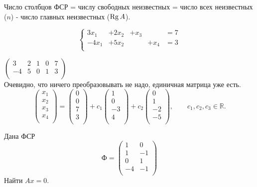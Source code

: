 Число столбцов ФСР = числу свободных неизвестных = число всех неизвестных ($n$) - число главных неизвестных ($\operatorname{\mathop{Rg}} A$). 
\begin{prim}
	$$
	\left\{
	\begin{array}{rrrrrl}
		3x_1&+2x_2&+x_3&&=7\\
		-4x_1&+5x_2&&+x_4&=3\\
	\end{array} \right.
	$$
\end{prim}
$
\left( \begin{array}{cccc|c}
3 & 2& 1 & 0& 7\\
-4 & 5& 0 & 1& 3\\
\end{array}\right)
$\\
Очевидно, что ничего преобразовывать не надо, единичная матрица уже есть.\\
$$
\begin{pmatrix}
x_1\\
x_2\\
x_3\\
x_4\\
\end{pmatrix}
=
\begin{pmatrix}
0\\
0\\
7\\
3\\
\end{pmatrix}
+c_1
\begin{pmatrix}
1\\
0\\
-3\\
4\\
\end{pmatrix}
+c_2
\begin{pmatrix}
0\\
1\\
-2\\
-5\\
\end{pmatrix}
, \qquad c_1, c_2, c_3 \in \mathbb{R}.
$$

\begin{prim}
	Дана ФСР
	$$
	\text{Ф}=
	\begin{pmatrix}
	1&0\\
	1&-1\\
	0&1\\
	-4&-1\\
	\end{pmatrix}
	$$
	Найти $Ax=0$.
\end{prim}

